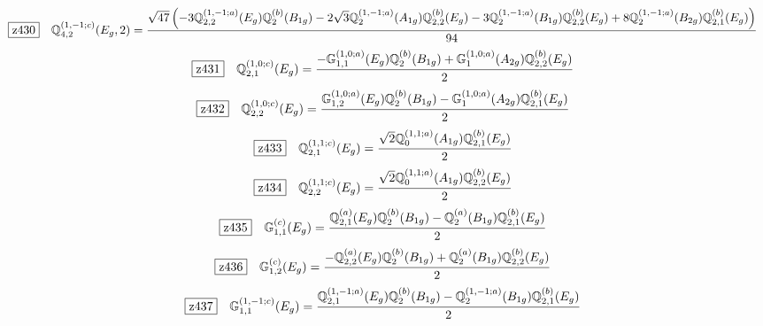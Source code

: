 \documentclass[fleqn,10pt,landscape]{jsarticle}
\begin{document}
\begin{dmath*}
\hspace*{3mm}\fbox{z430}\quad \mathbb{Q}_{4,2}^{(1,-1;c)}(E_{g},2)=\frac{\sqrt{47} \left(- 3 \mathbb{Q}_{2,2}^{(1,-1;a)}(E_{g}) \mathbb{Q}_{2}^{(b)}(B_{1g}) - 2 \sqrt{3} \mathbb{Q}_{2}^{(1,-1;a)}(A_{1g}) \mathbb{Q}_{2,2}^{(b)}(E_{g}) - 3 \mathbb{Q}_{2}^{(1,-1;a)}(B_{1g}) \mathbb{Q}_{2,2}^{(b)}(E_{g}) + 8 \mathbb{Q}_{2}^{(1,-1;a)}(B_{2g}) \mathbb{Q}_{2,1}^{(b)}(E_{g})\right)}{94}
\end{dmath*}
\begin{dmath*}
\hspace*{3mm}\fbox{z431}\quad \mathbb{Q}_{2,1}^{(1,0;c)}(E_{g})=\frac{- \mathbb{G}_{1,1}^{(1,0;a)}(E_{g}) \mathbb{Q}_{2}^{(b)}(B_{1g}) + \mathbb{G}_{1}^{(1,0;a)}(A_{2g}) \mathbb{Q}_{2,2}^{(b)}(E_{g})}{2}
\end{dmath*}
\begin{dmath*}
\hspace*{3mm}\fbox{z432}\quad \mathbb{Q}_{2,2}^{(1,0;c)}(E_{g})=\frac{\mathbb{G}_{1,2}^{(1,0;a)}(E_{g}) \mathbb{Q}_{2}^{(b)}(B_{1g}) - \mathbb{G}_{1}^{(1,0;a)}(A_{2g}) \mathbb{Q}_{2,1}^{(b)}(E_{g})}{2}
\end{dmath*}
\begin{dmath*}
\hspace*{3mm}\fbox{z433}\quad \mathbb{Q}_{2,1}^{(1,1;c)}(E_{g})=\frac{\sqrt{2} \mathbb{Q}_{0}^{(1,1;a)}(A_{1g}) \mathbb{Q}_{2,1}^{(b)}(E_{g})}{2}
\end{dmath*}
\begin{dmath*}
\hspace*{3mm}\fbox{z434}\quad \mathbb{Q}_{2,2}^{(1,1;c)}(E_{g})=\frac{\sqrt{2} \mathbb{Q}_{0}^{(1,1;a)}(A_{1g}) \mathbb{Q}_{2,2}^{(b)}(E_{g})}{2}
\end{dmath*}
\begin{dmath*}
\hspace*{3mm}\fbox{z435}\quad \mathbb{G}_{1,1}^{(c)}(E_{g})=\frac{\mathbb{Q}_{2,1}^{(a)}(E_{g}) \mathbb{Q}_{2}^{(b)}(B_{1g}) - \mathbb{Q}_{2}^{(a)}(B_{1g}) \mathbb{Q}_{2,1}^{(b)}(E_{g})}{2}
\end{dmath*}
\begin{dmath*}
\hspace*{3mm}\fbox{z436}\quad \mathbb{G}_{1,2}^{(c)}(E_{g})=\frac{- \mathbb{Q}_{2,2}^{(a)}(E_{g}) \mathbb{Q}_{2}^{(b)}(B_{1g}) + \mathbb{Q}_{2}^{(a)}(B_{1g}) \mathbb{Q}_{2,2}^{(b)}(E_{g})}{2}
\end{dmath*}
\begin{dmath*}
\hspace*{3mm}\fbox{z437}\quad \mathbb{G}_{1,1}^{(1,-1;c)}(E_{g})=\frac{\mathbb{Q}_{2,1}^{(1,-1;a)}(E_{g}) \mathbb{Q}_{2}^{(b)}(B_{1g}) - \mathbb{Q}_{2}^{(1,-1;a)}(B_{1g}) \mathbb{Q}_{2,1}^{(b)}(E_{g})}{2}
\end{dmath*}
\end{document}
